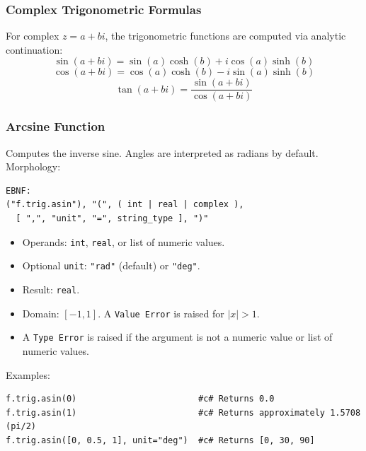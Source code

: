 \subsubsection{Complex Trigonometric Formulas}
For complex $z = a + bi$, the trigonometric functions are computed via analytic continuation:
\[
\sin(a + bi) = \sin(a)\cosh(b) + i\cos(a)\sinh(b)
\]
\[
\cos(a + bi) = \cos(a)\cosh(b) - i\sin(a)\sinh(b)
\]
\[
\tan(a + bi) = \frac{\sin(a + bi)}{\cos(a + bi)}
\]

\subsubsection{Arcsine Function}
Computes the inverse sine. Angles are interpreted as radians by default. \\
Morphology:
\begin{verbatim}
EBNF:
("f.trig.asin"), "(", ( int | real | complex ), 
  [ ",", "unit", "=", string_type ], ")"
\end{verbatim}
\begin{itemize}
\item Operands: \texttt{int}, \texttt{real}, or list of numeric values.
\item Optional \texttt{unit}: \texttt{"rad"} (default) or \texttt{"deg"}.
\item Result: \texttt{real}.
\item Domain: $[-1, 1]$. A \texttt{Value Error} is raised for $|x| > 1$.
\item A \texttt{Type Error} is raised if the argument is not a numeric value or list of numeric values.
\end{itemize}
Examples:
\begin{verbatim}
f.trig.asin(0)                        #c# Returns 0.0
f.trig.asin(1)                        #c# Returns approximately 1.5708 (pi/2)
f.trig.asin([0, 0.5, 1], unit="deg")  #c# Returns [0, 30, 90]
\end{verbatim}

